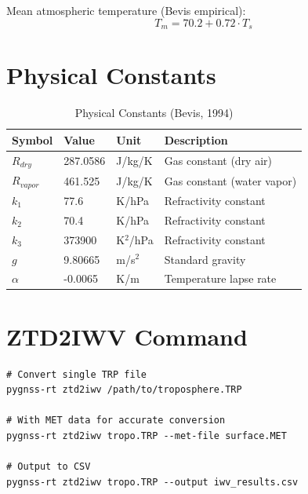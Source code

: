 \documentclass[11pt,a4paper,twoside]{report}
\begin{document}
Mean atmospheric temperature (Bevis empirical):
\begin{equation}
T_m = 70.2 + 0.72 \cdot T_s
\end{equation}

\section{Physical Constants}

\begin{table}[H]
\centering
\caption{Physical Constants (Bevis, 1994)}
\label{tab:constants}
\begin{tabular}{@{}lllp{4cm}@{}}
\toprule
\textbf{Symbol} & \textbf{Value} & \textbf{Unit} & \textbf{Description} \\
\midrule
$R_{dry}$ & 287.0586 & J/kg/K & Gas constant (dry air) \\
$R_{vapor}$ & 461.525 & J/kg/K & Gas constant (water vapor) \\
$k_1$ & 77.6 & K/hPa & Refractivity constant \\
$k_2$ & 70.4 & K/hPa & Refractivity constant \\
$k_3$ & 373900 & K$^2$/hPa & Refractivity constant \\
$g$ & 9.80665 & m/s$^2$ & Standard gravity \\
$\alpha$ & -0.0065 & K/m & Temperature lapse rate \\
\bottomrule
\end{tabular}
\end{table}

\section{ZTD2IWV Command}

\begin{lstlisting}[style=bashstyle, caption={ZTD to IWV Conversion}, label={lst:ztd2iwv}]
# Convert single TRP file
pygnss-rt ztd2iwv /path/to/troposphere.TRP

# With MET data for accurate conversion
pygnss-rt ztd2iwv tropo.TRP --met-file surface.MET

# Output to CSV
pygnss-rt ztd2iwv tropo.TRP --output iwv_results.csv
\end{lstlisting}

\end{document}
